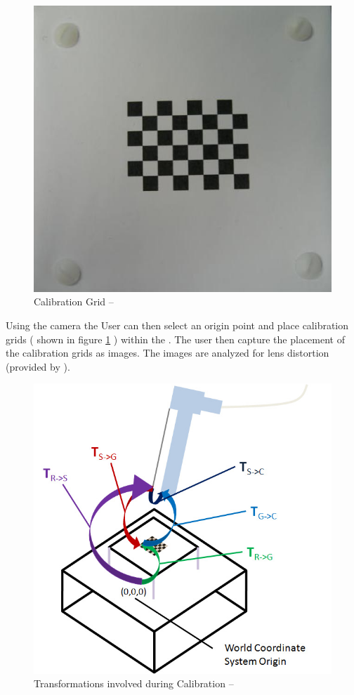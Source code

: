\documentclass[11pt]{report}
\begin{document}
\begin{figure}[htp]
\centering
\includegraphics[scale=0.45]{images/board.png}
\caption{Calibration Grid --\cite{CC}}
\label{fig:grid}
\end{figure}

Using the camera the User can then select an origin point and place calibration grids ( shown in figure \ref{fig:grid} ) within the . The user then capture the placement of the calibration grids as images.
The images are analyzed for lens distortion (provided by ). 


\begin{figure}[htp]
\centering
\includegraphics[scale=0.45]{images/Coordinates.png}
\caption{Transformations involved during Calibration --\cite{CC}}
\label{fig:coord}
\end{figure}
\end{document}
